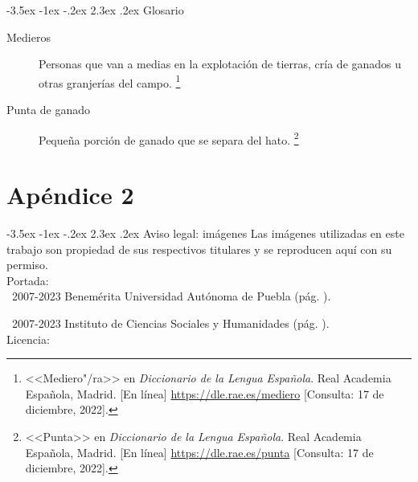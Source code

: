 \documentclass[14pt,twoside,final]{extbook} %
\makeatletter
\let\oldfootnote\footnote
\renewcommand\footnote[1]{%
\oldfootnote{\hspace{1mm}#1}}
\renewcommand\section{\@startsection {section}{1}{\z@}%
                                     {-3.5ex \@plus -1ex \@minus -.2ex}%
                                     {2.3ex \@plus .2ex}%
                                     {\normalfont\large\bfseries\sc}}
\makeatother
\begin{document}
\section{Glosario}\label{sec:glosario}
\begin{description}
\item[Medieros]Personas que van a medias en la explotación de tierras, cría de ganados u otras granjerías del campo.\footnote{<<Mediero"/ra>> en \emph{Diccionario de la Lengua Española}. Real Academia Española, Madrid. [En línea] \url{https://dle.rae.es/mediero} [Consulta: 17 de diciembre, 2022].}
\item[Punta de ganado]Pequeña porción de ganado que se separa del hato.\footnote{<<Punta>> en \emph{Diccionario de la Lengua Española}. Real Academia Española, Madrid. [En línea] \url{https://dle.rae.es/punta} [Consulta: 17 de diciembre, 2022].}
\end{description}
\chapter{Apéndice 2}\label{ap:apendice-dos}
\thispagestyle{empty}
\pagestyle{fancy}
\fancyhf{} %
\fancyhead[RO,LE]{\thepage}
\renewcommand{\headrulewidth}{0pt}
\setcounter{page}{139}
\section{Aviso legal: imágenes}\label{sec:aviso-legal-imágenes}
Las imágenes utilizadas en este trabajo son propiedad de sus respectivos titulares y se reproducen aquí con su permiso. \\

\noindent Portada: \\

\noindent\textcopyright\ 2007-2023 Benemérita Universidad Autónoma de Puebla (pág. \pageref{fig:buap}).

\noindent\textcopyright\ 2007-2023 Instituto de Ciencias Sociales y Humanidades (pág. \pageref{fig:icsyh}). \\

\noindent Licencia: \\
\end{document}
